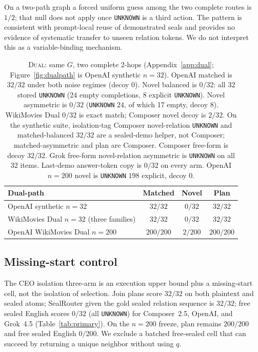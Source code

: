 \documentclass[10pt]{article} %
\begin{document}
On a two-path graph a forced uniform guess among the two complete routes
is $1/2$; that null does not apply once \texttt{UNKNOWN} is a third action.
The pattern is consistent with prompt-local reuse of demonstrated seals
and provides no evidence of systematic transfer to unseen relation tokens.
We do not interpret this as a variable-binding mechanism.

\begin{table}[ht]
\centering
\small

\caption{\textsc{Dual}: same $G$, two complete 2-hops
(Appendix~\ref{app:dual}; Figure~\ref{fig:dualpath} is OpenAI synthetic
$n{=}32$).
OpenAI matched is $32/32$ under both noise regimes (decoy $0$).
Novel balanced is $0/32$: all 32 stored \texttt{UNKNOWN}
(24 empty completions, 8 explicit \texttt{UNKNOWN}).
Novel asymmetric is $0/32$ (\texttt{UNKNOWN} $24$, of which 17 empty,
decoy $8$).
WikiMovies Dual $0/32$ is exact match; Composer novel decoy is $2/32$.
On the synthetic suite, isolation-tag Composer novel-relation
\texttt{UNKNOWN} and matched-balanced $32/32$ are a sealed-demo helper, not
Composer; matched-asymmetric and plan are Composer.
Composer free-form is decoy $32/32$.
Grok free-form novel-relation asymmetric is \texttt{UNKNOWN} on all 32 items.
Last-demo answer-token copy is $0/32$ on every arm.
OpenAI $n{=}200$ novel is \texttt{UNKNOWN} $198$ explicit, decoy $0$.}
\label{tab:dualpath}
\begin{tabular}{@{}lccc@{}}
\toprule
Dual-path & Matched & Novel & Plan \\
\midrule
OpenAI synthetic $n{=}32$ & $32/32$ & $0/32$ & $32/32$ \\
WikiMovies Dual $n{=}32$ (three families) & $32/32$ & $0/32$ & $32/32$ \\
OpenAI WikiMovies Dual $n{=}200$ & $200/200$ & $2/200$ & $200/200$ \\
\bottomrule
\end{tabular}

\end{table}
\FloatBarrier

\subsection{Missing-start control}
\label{sec:ceonl}

The CEO isolation three-arm is an execution upper bound plus a missing-start
cell, not the isolation of selection. Join plans score $32/32$ on both
plaintext and sealed atoms; SealRouter given the gold sealed relation
sequence is $32/32$; free sealed English scores $0/32$ (all
\texttt{UNKNOWN}) for Composer~2.5, OpenAI, and Grok~4.5
(Table~\ref{tab:primary}).
On the $n{=}200$ freeze, plan remains $200/200$ and free sealed English
$0/200$.
We exclude a batched free-sealed cell that can
succeed by returning a unique neighbor without using $q$.
\end{document}
